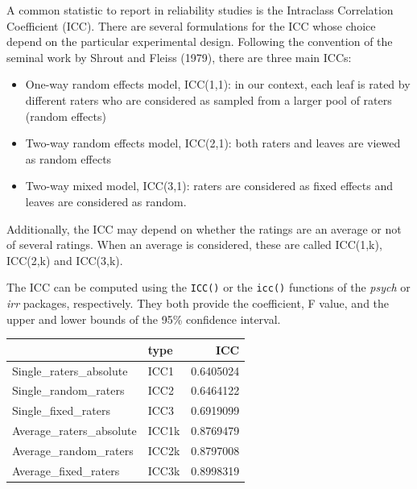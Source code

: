 \documentclass[
  letterpaper,
  DIV=11,
  numbers=noendperiod]{scrreprt}
\newenvironment{Shaded}{\begin{snugshade}}{\end{snugshade}}
\newcommand{\CommentTok}[1]{\textcolor[rgb]{0.37,0.37,0.37}{#1}}
\newcommand{\DecValTok}[1]{\textcolor[rgb]{0.68,0.00,0.00}{#1}}
\newcommand{\FunctionTok}[1]{\textcolor[rgb]{0.28,0.35,0.67}{#1}}
\newcommand{\NormalTok}[1]{\textcolor[rgb]{0.00,0.23,0.31}{#1}}
\newcommand{\OtherTok}[1]{\textcolor[rgb]{0.00,0.23,0.31}{#1}}
\newcommand{\SpecialCharTok}[1]{\textcolor[rgb]{0.37,0.37,0.37}{#1}}
\begin{document}
A common statistic to report in reliability studies is the Intraclass
Correlation Coefficient (ICC). There are several formulations for the
ICC whose choice depend on the particular experimental design. Following
the convention of the seminal work by Shrout and Fleiss (1979), there
are three main ICCs:

\begin{itemize}
\item
  One-way random effects model, ICC(1,1): in our context, each leaf is
  rated by different raters who are considered as sampled from a larger
  pool of raters (random effects)
\item
  Two-way random effects model, ICC(2,1): both raters and leaves are
  viewed as random effects
\item
  Two-way mixed model, ICC(3,1): raters are considered as fixed effects
  and leaves are considered as random.
\end{itemize}

Additionally, the ICC may depend on whether the ratings are an average
or not of several ratings. When an average is considered, these are
called ICC(1,k), ICC(2,k) and ICC(3,k).

The ICC can be computed using the \texttt{ICC()} or the \texttt{icc()}
functions of the \emph{psych} or \emph{irr} packages, respectively. They
both provide the coefficient, F value, and the upper and lower bounds of
the 95\% confidence interval.

\begin{Shaded}
\end{Shaded}

\begin{longtable}[]{@{}llr@{}}
\toprule\noalign{}
& type & ICC \\
\midrule\noalign{}
\endhead
\bottomrule\noalign{}
\endlastfoot
Single\_raters\_absolute & ICC1 & 0.6405024 \\
Single\_random\_raters & ICC2 & 0.6464122 \\
Single\_fixed\_raters & ICC3 & 0.6919099 \\
Average\_raters\_absolute & ICC1k & 0.8769479 \\
Average\_random\_raters & ICC2k & 0.8797008 \\
Average\_fixed\_raters & ICC3k & 0.8998319 \\
\end{longtable}
\end{document}
